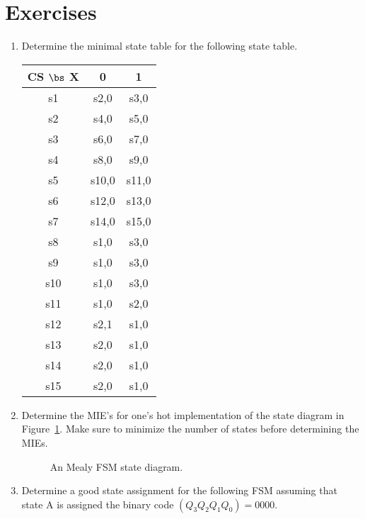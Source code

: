 \section{Exercises}
\begin{enumerate}

    \item Determine the minimal state table for the following
        state table.

        \begin{tabular}{c||c|c}
            CS $\bs$ X &  0     &  1 \\ \hline \hline
            s1  &  s2,0  &  s3,0 \\ \hline
            s2  &  s4,0  &  s5,0 \\ \hline
            s3  &  s6,0  &  s7,0 \\ \hline
            s4  &  s8,0  &  s9,0 \\ \hline
            s5  &  s10,0 &  s11,0 \\ \hline
            s6  &  s12,0 &  s13,0 \\ \hline
            s7  &  s14,0 &  s15,0 \\ \hline
            s8  &  s1,0  &  s3,0 \\ \hline
            s9  &  s1,0  &  s3,0 \\ \hline
            s10 &  s1,0  &  s3,0 \\ \hline
            s11 &  s1,0  &  s2,0 \\ \hline
            s12 &  s2,1  &  s1,0 \\ \hline
            s13 &  s2,0  &  s1,0 \\ \hline
            s14 &  s2,0  &  s1,0 \\ \hline
            s15 &  s2,0  &  s1,0 \\
        \end{tabular}

    \item Determine the MIE's for one's hot implementation of the state
        diagram in Figure~\ref{fig:MinState}.  Make sure to minimize the
        number of states before determining the MIEs.
        \begin{figure}[ht]
            \caption{An Mealy FSM state diagram.}
            \label{fig:MinState}
        \end{figure}

    \item Determine a good state assignment for the following FSM assuming
        that state A is assigned the binary code $(Q_3 Q_2 Q_1 Q_0) = 0000$.


\end{enumerate}
